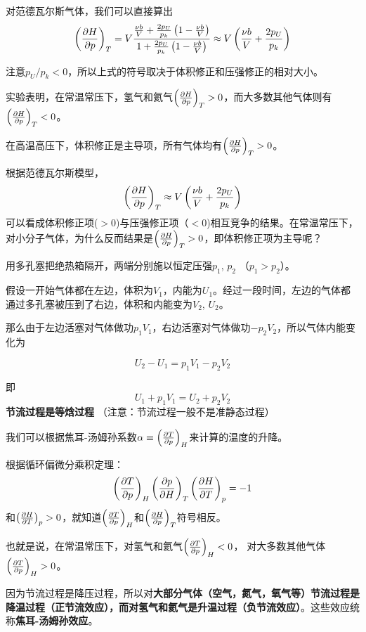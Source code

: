 \documentclass[CJK]{beamer}
\begin{document}
\begin{frame}
\bch

对范德瓦尔斯气体，我们可以直接算出
$$\left(\frac{\partial H}{\partial p}\right)_{T} = V\frac{\frac{\nu b}{V} + \frac{2p_U}{p_k}\left(1- \frac{\nu b}{V}\right)}{1 + \frac{2p_U}{p_k}\left(1-\frac{\nu b}{V}\right)}\approx V\left(\frac{\nu b}{V} +\frac{2p_U}{p_k}\right)$$

注意$p_U/p_k<0$，所以上式的符号取决于体积修正和压强修正的相对大小。

\emini
{}
{\small 
实验表明，在常温常压下，氢气和氦气$\left(\frac{\partial H}{\partial p}\right)_{T} > 0$，而大多数其他气体则有$\left(\frac{\partial H}{\partial p}\right)_{T} < 0$。

在高温高压下，体积修正是主导项，所有气体均有$\left(\frac{\partial H}{\partial p}\right)_{T} > 0$。
}
\emini

\ech
\end{frame}

\begin{frame}
\bch
{}

根据范德瓦尔斯模型，$$\left(\frac{\partial H}{\partial p}\right)_{T}\approx V\left(\frac{\nu b}{V} + \frac{2p_U}{p_k}\right)$$
可以看成体积修正项($>0$)与压强修正项（$<0$)相互竞争的结果。在常温常压下，对小分子气体，为什么反而结果是$\left(\frac{\partial H}{\partial p}\right)_{T} > 0$，即体积修正项为主导呢？

\ech
\end{frame}

\begin{frame}
\bch

\emini
{}
用多孔塞把绝热箱隔开，两端分别施以恒定压强$p_1$, $p_2$ （$p_1>p_2$）。
\emini

{\small

假设一开始气体都在左边，体积为$V_1$，内能为$U_1$。经过一段时间，左边的气体都通过多孔塞被压到了右边，体积和内能变为$V_2$, $U_2$。

那么由于左边活塞对气体做功$p_1V_1$，右边活塞对气体做功$-p_2V_2$，所以气体内能变化为

$$U_2 - U_1  = p_1V_1 - p_2V_2$$

即
$$ U_1 + p_1V_1 = U_2 + p_2V_2 $$
{\blue \bf 节流过程是等焓过程} （注意：节流过程一般不是准静态过程）

}
\ech
\end{frame}


\begin{frame}
\bch
{\small
我们可以根据焦耳-汤姆孙系数$\alpha \equiv \left(\frac{\partial T}{\partial p}\right)_{H}$来计算的温度的升降。

根据循环偏微分乘积定理：
$$\left(\frac{\partial T}{\partial p}\right)_{H} \left(\frac{\partial p}{\partial H}\right)_{T} \left(\frac{\partial H}{\partial T}\right)_{p} = -1$$
和$\left(\frac{\partial H}{\partial T}\right)_{p} > 0$，就知道$\left(\frac{\partial T}{\partial p}\right)_{H}$和$\left(\frac{\partial H}{\partial p}\right)_{T}$符号相反。

也就是说，在常温常压下，对氢气和氦气$\left(\frac{\partial T}{\partial p}\right)_{H} < 0$， 对大多数其他气体$\left(\frac{\partial T}{\partial p}\right)_{H} > 0$。

因为节流过程是降压过程，所以对{\bf 大部分气体（空气，氮气，氧气等）节流过程是降温过程（正节流效应），而对氢气和氦气是升温过程（负节流效应）}。这些效应统称{\bf 焦耳-汤姆孙效应}。
}
\ech
\end{frame}
\end{document}
